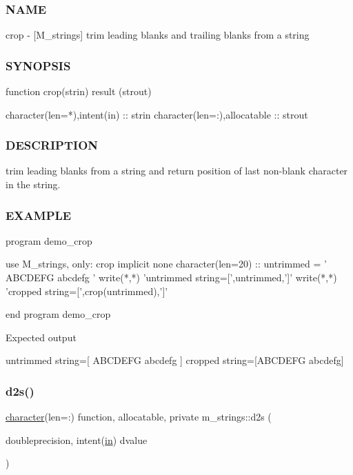 \subsubsection*{N\+A\+ME}

crop -\/ \mbox{[}M\+\_\+strings\mbox{]} trim leading blanks and trailing blanks from a string 

\subsubsection*{S\+Y\+N\+O\+P\+S\+IS}

\begin{DoxyVerb}function crop(strin) result (strout)

 character(len=*),intent(in)  :: strin
 character(len=:),allocatable :: strout
\end{DoxyVerb}


\subsubsection*{D\+E\+S\+C\+R\+I\+P\+T\+I\+ON}

trim leading blanks from a string and return position of last non-\/blank character in the string.

\subsubsection*{E\+X\+A\+M\+P\+LE}

\begin{DoxyVerb}program demo_crop

 use M_strings, only: crop
 implicit none
 character(len=20) ::  untrimmed = '   ABCDEFG abcdefg  '
    write(*,*) 'untrimmed string=[',untrimmed,']'
    write(*,*) 'cropped string=[',crop(untrimmed),']'

end program demo_crop

Expected output

  untrimmed string=[   ABCDEFG abcdefg                      ]
  cropped string=[ABCDEFG abcdefg] \end{DoxyVerb}
 \mbox{\label{namespacem__strings_ae4fac72ec3065d73aa06a107e41004b7}} 
\subsubsection{\texorpdfstring{d2s()}{d2s()}}
{\footnotesize\ttfamily \hyperlink{option__stopwatch_83_8txt_abd4b21fbbd175834027b5224bfe97e66}{character}(len=\+:) function, allocatable, private m\+\_\+strings\+::d2s (\begin{DoxyParamCaption}\item[{doubleprecision, intent(\hyperlink{M__journal_83_8txt_afce72651d1eed785a2132bee863b2f38}{in})}]{dvalue }\end{DoxyParamCaption})\hspace{0.3cm}{\ttfamily [private]}}



